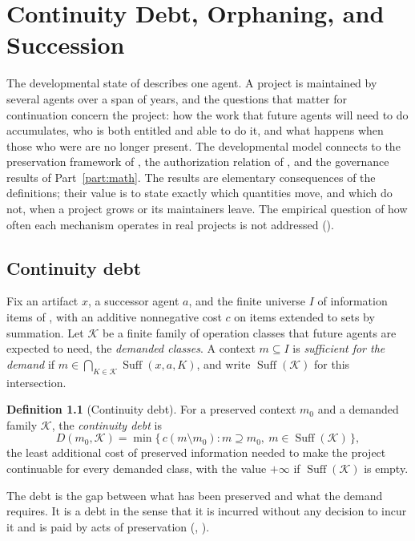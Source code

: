 \documentclass[11pt,twoside,openright]{book}
\theoremstyle{plain}
\theoremstyle{definition}
\newtheorem{definition}[theorem]{Definition}
\theoremstyle{remark}
\newcommand{\Suff}{\operatorname{Suff}}
\begin{document}
\chapter{Continuity Debt, Orphaning, and Succession}\label{ch:debt}

The developmental state of  describes one agent. A project is maintained by several agents over a span of years, and the questions that matter for continuation concern the project: how the work that future agents will need to do accumulates, who is both entitled and able to do it, and what happens when those who were are no longer present. The developmental model connects to the preservation framework of , the authorization relation of , and the governance results of Part~\ref{part:math}. The results are elementary consequences of the definitions; their value is to state exactly which quantities move, and which do not, when a project grows or its maintainers leave. The empirical question of how often each mechanism operates in real projects is not addressed ().

\section{Continuity debt}

Fix an artifact $x$, a successor agent $a$, and the finite universe $I$ of information items of , with an additive nonnegative cost $c$ on items extended to sets by summation. Let $\mathcal{K}$ be a finite family of operation classes that future agents are expected to need, the \emph{demanded classes}. A context $m\subseteq I$ is \emph{sufficient for the demand} if $m\in\bigcap_{K\in\mathcal{K}}\Suff(x,a,K)$, and write $\Suff(\mathcal{K})$ for this intersection.

\begin{definition}[Continuity debt]\label{def:contdebt}
For a preserved context $m_0$ and a demanded family $\mathcal{K}$, the \emph{continuity debt} is
\[
D(m_0,\mathcal{K})=\min\{\,c(m\setminus m_0): m\supseteq m_0,\ m\in\Suff(\mathcal{K})\,\},
\]
the least additional cost of preserved information needed to make the project continuable for every demanded class, with the value $+\infty$ if $\Suff(\mathcal{K})$ is empty.
\end{definition}

The debt is the gap between what has been preserved and what the demand requires. It is a debt in the sense that it is incurred without any decision to incur it and is paid by acts of preservation (, ).
\end{document}
